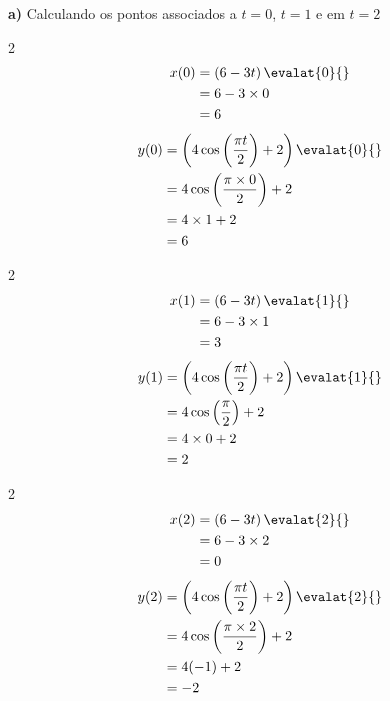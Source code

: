 \documentclass[a4paper,12pt,fleqn]{article}
\begin{document}
\begin{answer}
  \textbf{a)} \quad
  Calculando os pontos associados a $t=0$, $t=1$ e em $t=2$
  \begin{multicols}{2}
    \begin{align*}
      x(0)
      & = \left(6 - 3t\right)\evalat{0}{} \\
      & = 6 - 3\times 0 \\
      & = 6
    \end{align*}
    \newcolumn
    \begin{align*}
      y(0)
      & = \left(4\cos\left(\frac{\pi t}{2}\right) + 2 \right)\evalat{0}{} \\
      & = 4\cos\left(\frac{\pi \times 0}{2}\right) + 2 \\
      & = 4 \times 1 + 2 \\
      & = 6
    \end{align*}
  \end{multicols}
  \begin{multicols}{2}
    \begin{align*}
      x(1)
      & = \left(6 - 3t\right)\evalat{1}{} \\
      & = 6 - 3\times 1 \\
      & = 3
    \end{align*}
    \newcolumn
    \begin{align*}
      y(1)
      & = \left(4\cos\left(\frac{\pi t}{2}\right) + 2 \right)\evalat{1}{} \\
      & = 4\cos\left(\frac{\pi}{2}\right) + 2 \\
      & = 4 \times 0 + 2 \\
      & = 2
    \end{align*}
  \end{multicols}
  \begin{multicols}{2}
    \begin{align*}
      x(2)
      & = \left(6 - 3t\right)\evalat{2}{} \\
      & = 6 - 3\times 2 \\
      & = 0
    \end{align*}
    \newcolumn
    \begin{align*}
      y(2)
      & = \left(4\cos\left(\frac{\pi t}{2}\right) + 2 \right)\evalat{2}{} \\
      & = 4\cos\left(\frac{\pi \times 2}{2}\right) + 2 \\
      & = 4(-1) + 2 \\
      & = -2
    \end{align*}
  \end{multicols}


\end{answer}
\end{document}
